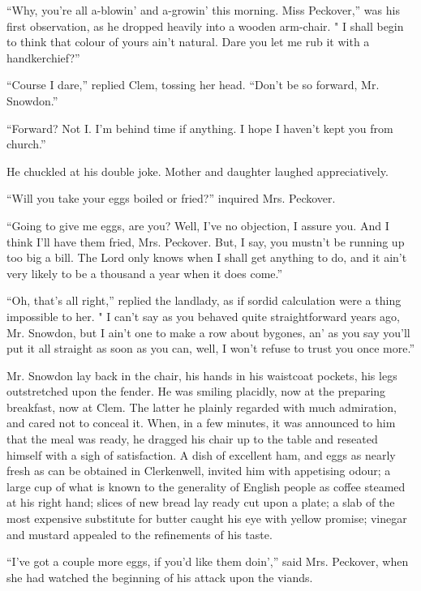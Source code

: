 ``Why, you're all a-blowin' and a-growin' this morning. Miss Peckover,''
was his first observation, as he dropped heavily into a
{\protect\hypertarget{6}{}{}}wooden arm-chair. " I shall begin to think
that colour of yours ain't natural. Dare you let me rub it with a
handkerchief?''

``Course I dare,'' replied Clem, tossing her head. ``Don't be so
forward, Mr. Snowdon.''

``Forward? Not I. I'm behind time if anything. I hope I haven't kept you
from church.''

He chuckled at his double joke. Mother and daughter laughed
appreciatively.

``Will you take your eggs boiled or fried?'' inquired Mrs. Peckover.

``Going to give me eggs, are you? Well, I've no objection, I assure you.
And I think I'll have them fried, Mrs. Peckover. But, I say, you mustn't
be running up too big a bill. The Lord only knows when I shall get
anything to do, and it ain't very likely to be a thousand a year when it
does come.''

``Oh, that's all right,'' replied the landlady, as if sordid calculation
were a thing impossible to her. " I can't say as you behaved quite
straightforward years ago, Mr. Snowdon, but I ain't one to make a row
about bygones, {\protect\hypertarget{7}{}{}}an' as you say you'll put it
all straight as soon as you can, well, I won't refuse to trust you once
more.''

Mr. Snowdon lay back in the chair, his hands in his waistcoat pockets,
his legs outstretched upon the fender. He was smiling placidly, now at
the preparing breakfast, now at Clem. The latter he plainly regarded
with much admiration, and cared not to conceal it. When, in a few
minutes, it was announced to him that the meal was ready, he dragged his
chair up to the table and reseated himself with a sigh of satisfaction.
A dish of excellent ham, and eggs as nearly fresh as can be obtained in
Clerkenwell, invited him with appetising odour; a large cup of what is
known to the generality of English people as coffee steamed at his right
hand; slices of new bread lay ready cut upon a plate; a slab of the most
expensive substitute for butter caught his eye with yellow promise;
vinegar and mustard appealed to the refinements of his taste.

``I've got a couple more eggs, if you'd like
{\protect\hypertarget{8}{}{}}them doin','' said Mrs. Peckover, when she
had watched the beginning of his attack upon the viands.

